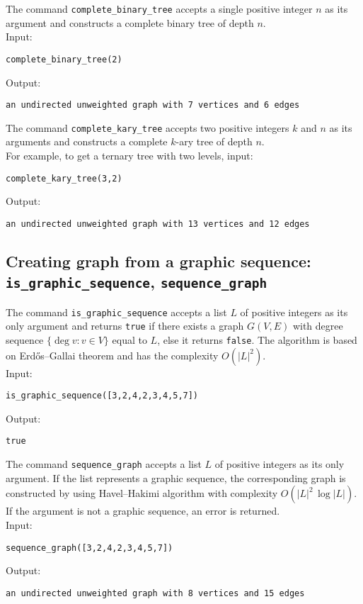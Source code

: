 \documentclass[a4paper,11pt]{article}
\begin{document}
The command {\tt complete\_binary\_tree} accepts a single positive integer $ n $ as its argument and constructs a complete binary tree of depth $ n $.\\
Input:
\begin{center}
  \tt complete\_binary\_tree(2)
\end{center}
Output:
\begin{center}
  \tt an undirected unweighted graph with 7 vertices and 6 edges
\end{center}

The command {\tt complete\_kary\_tree} accepts two positive integers $ k $ and $ n $ as its arguments and constructs a complete $ k $-ary tree of depth $ n $.\\
For example, to get a ternary tree with two levels, input:
\begin{center}
  \tt complete\_kary\_tree(3,2)
\end{center}
Output:
\begin{center}
  \tt an undirected unweighted graph with 13 vertices and 12 edges
\end{center}

\subsection{Creating graph from a graphic sequence: {\tt is\_graphic\_sequence}, {\tt sequence\_graph}}

The command {\tt is\_graphic\_sequence} accepts a list $ L $ of positive integers as its only argument and returns {\tt true} if there exists a graph $ G(V,E) $ with degree sequence $ \{\deg v:v\in V\} $ equal to $ L $, else it returns {\tt false}. The algorithm is based on Erdős--Gallai theorem and has the complexity $ O(|L|^2) $.\\ 
Input:
\begin{center}
   \tt is\_graphic\_sequence([3,2,4,2,3,4,5,7])
\end{center}
Output:
\begin{center}
  \tt true
\end{center}

The command {\tt sequence\_graph} accepts a list $ L $ of positive integers as its only argument. If the list represents a graphic sequence, the corresponding graph is constructed by using Havel--Hakimi algorithm with complexity $ O(|L|^2\,\log |L|) $. If the argument is not a graphic sequence, an error is returned.\\
Input:
\begin{center}
  \tt sequence\_graph([3,2,4,2,3,4,5,7])
\end{center}
Output:
\begin{center}
  \tt an undirected unweighted graph with 8 vertices and 15 edges
\end{center}
\end{document}
